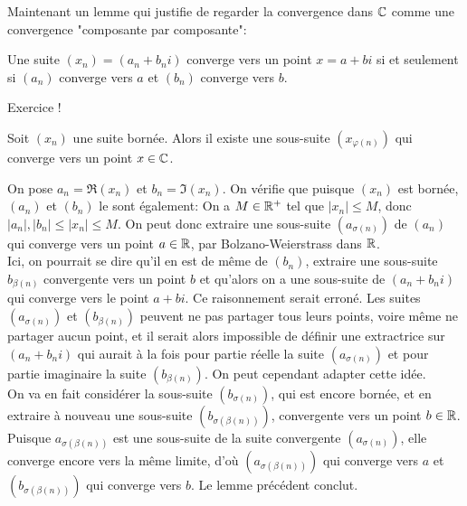 \documentclass{article}
\begin{document}
Maintenant un lemme qui justifie de regarder la convergence dans $\mathbb{C}$ comme une convergence "composante par composante":
\begin{lemme}
    Une suite $(x_n) = (a_n + b_ni)$ converge vers un point $x = a+bi$ si et seulement si $(a_n)$ converge vers $a$ et $(b_n)$ converge vers $b$.
\end{lemme}

\begin{preuve}
    Exercice !
\end{preuve}

\begin{proposition}
    Soit $(x_n)$ une suite bornée. Alors il existe une sous-suite $(x_{\varphi(n)})$ qui converge vers un point $x \in \mathbb{C}$.
\end{proposition}

\begin{preuve}
    On pose $a_n = \Re(x_n)$ et $b_n = \Im(x_n)$. On vérifie que puisque $(x_n)$ est bornée, $(a_n)$ et $(b_n)$ le sont également: On a $M \in \mathbb{R}^+$ tel que $|x_n| \leq M$, donc $|a_n|, |b_n| \leq |x_n| \leq M$. On peut donc extraire une sous-suite $(a_{\sigma(n)})$ de $(a_n)$ qui converge vers un point $a \in \mathbb{R}$, par Bolzano-Weierstrass dans $\mathbb{R}$.\\

    Ici, on pourrait se dire qu'il en est de même de $(b_n)$, extraire une sous-suite $b_{\beta(n)}$ convergente vers un point $b$ et qu'alors on a une sous-suite de $(a_n + b_ni)$ qui converge vers le point $a + bi$. Ce raisonnement serait erroné. Les suites $(a_{\sigma(n)})$ et $(b_{\beta(n)})$ peuvent ne pas partager tous leurs points, voire même ne partager aucun point, et il serait alors impossible de définir une extractrice sur $(a_n + b_ni)$ qui aurait à la fois pour partie réelle la suite $(a_{\sigma(n)})$ et pour partie imaginaire la suite $(b_{\beta(n)})$. On peut cependant adapter cette idée.\\

    On va en fait considérer la sous-suite $(b_{\sigma(n)})$, qui est encore bornée, et en extraire à nouveau une sous-suite $(b_{\sigma(\beta(n))})$, convergente vers un point $b \in \mathbb{R}$. Puisque $a_{\sigma(\beta(n))}$ est une sous-suite de la suite convergente $(a_{\sigma(n)})$, elle converge encore vers la même limite, d'où $(a_{\sigma(\beta(n))})$ qui converge vers $a$ et $(b_{\sigma(\beta(n))})$ qui converge vers $b$. Le lemme précédent conclut.
\end{preuve}
\end{document}
